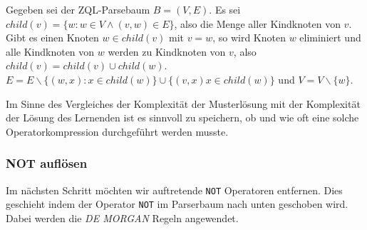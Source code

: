 Gegeben sei der ZQL-Parsebaum $B=(V,E)$. Es sei $child(v) = \{ w : w\in V \wedge (v,w)\in E\}$, also die Menge aller Kindknoten von $v$. Gibt es einen Knoten $w\in child(v)$ mit $v=w$, so wird Knoten $w$ eliminiert und alle Kindknoten von $w$ werden zu Kindknoten von $v$, also $child(v) = child(v) \cup child(w)$. 
$E=E\backslash \{ (w,x) : x\in child(w)\} \cup \{(v,x) x\in child(w)\}$ und $V=V\backslash \{w\}$.

Im Sinne des Vergleiches der Komplexität der Musterlösung mit der Komplexität der Lösung des Lernenden ist es sinnvoll zu speichern, ob und wie oft eine solche Operatorkompression durchgeführt werden musste.

\subsubsection{NOT auflösen}

Im nächsten Schritt möchten wir auftretende \verb|NOT| Operatoren entfernen. Dies geschieht indem der Operator \verb|NOT| im Parserbaum nach unten geschoben wird. Dabei werden die \textit{DE MORGAN} Regeln angewendet. 

